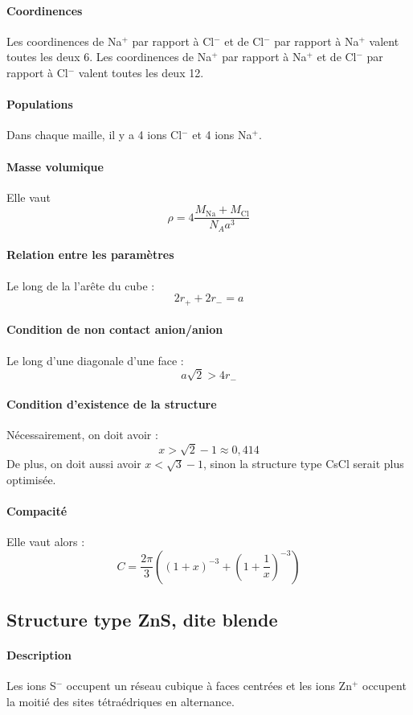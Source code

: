 \documentclass[french]{book}
\theoremstyle{plain}
\theoremstyle{definition}
\theoremstyle{remark}
\begin{document}
\paragraph{Coordinences} Les coordinences de Na$^+$ par rapport à Cl$^-$ et de Cl$^-$ par rapport à Na$^+$ valent toutes les deux $6$. Les coordinences de Na$^+$ par rapport à Na$^+$ et de Cl$^-$ par rapport à Cl$^-$ valent toutes les deux 12.
\paragraph{Populations} Dans chaque maille, il y a 4 ions Cl$^-$ et 4 ions Na$^+$.
\paragraph{Masse volumique} Elle vaut $$\rho=4\frac{M_{\text{Na}}+M_\text{Cl}}{N_Aa^3}$$
\paragraph{Relation entre les paramètres} Le long de la l'arête du cube : $$2r_++2r_-=a$$
\paragraph{Condition de non contact anion/anion} Le long d'une diagonale d'une face : $$a\sqrt{2}>4r_-$$
\paragraph{Condition d'existence de la structure} Nécessairement, on doit avoir : $$x>\sqrt{2}-1\approx 0,414$$ De plus, on doit aussi avoir $x<\sqrt{3}-1$, sinon la structure type CsCl serait plus optimisée.
\paragraph{Compacité} Elle vaut alors : $$C=\frac{2\pi}{3}\left(\left(1+x\right)^{-3}+\left(1+\frac{1}{x}\right)^{-3}\right)$$

\subsection{Structure type ZnS, dite blende}
\paragraph{Description} Les ions S$^-$ occupent un réseau cubique à faces centrées et les ions Zn$^+$ occupent la moitié des sites tétraédriques en alternance.
\end{document}
